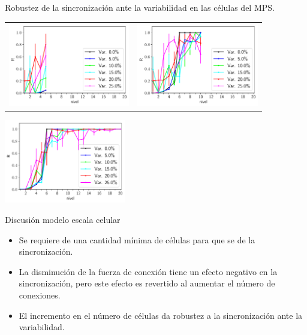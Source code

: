 \documentclass[xcolor=table, xllnames]{beamer}
\begin{document}
\begin{frame}{Robustez de la sincronización ante la variabilidad en las células del MPS.}

\centering
\begin{tabular}{c c}
	\includegraphics[width=5.3cm]{Figuras/figuraVCIVer69_preAv.pdf}&
	\includegraphics[width=5.3cm]{Figuras/figuraVCIVer71_preAv.pdf} 
\end{tabular}
	\includegraphics[width=5.3cm]{Figuras/figuraVCIVer68_preAv.pdf} 
\end{frame}

\begin{frame} {Discusión modelo escala celular}
\begin{itemize}
	\item Se requiere de una cantidad mínima de células para que se de la sincronización.
	
	\item La disminución de la fuerza de conexión tiene un efecto negativo en la sincronización, pero este efecto es revertido al aumentar el número de conexiones.
	
	\item {El incremento en el n\'umero de c\'elulas da robustez a la sincronización ante la variabilidad.}
	
	
\end{itemize}
\end{frame}
\end{document}
